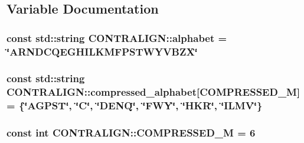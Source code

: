 \subsection{Variable Documentation}
\hypertarget{namespace_c_o_n_t_r_a_l_i_g_n_a2ff97191ea8854b1801441553af77857}{
\subsubsection[{alphabet}]{\setlength{\rightskip}{0pt plus 5cm}const std\+::string C\+O\+N\+T\+R\+A\+L\+I\+G\+N\+::alphabet = \char`\"{}A\+R\+N\+D\+C\+Q\+E\+G\+H\+I\+L\+K\+M\+F\+P\+S\+T\+W\+Y\+V\+B\+Z\+X\char`\"{}}}\label{namespace_c_o_n_t_r_a_l_i_g_n_a2ff97191ea8854b1801441553af77857}
\hypertarget{namespace_c_o_n_t_r_a_l_i_g_n_abc81d204924eda147b14d8d4da2b3f21}{
\subsubsection[{compressed\+\_\+alphabet}]{\setlength{\rightskip}{0pt plus 5cm}const std\+::string C\+O\+N\+T\+R\+A\+L\+I\+G\+N\+::compressed\+\_\+alphabet\mbox{[}{\bf C\+O\+M\+P\+R\+E\+S\+S\+E\+D\+\_\+\+M}\mbox{]} = \{\char`\"{}A\+G\+P\+S\+T\char`\"{}, \char`\"{}C\char`\"{}, \char`\"{}D\+E\+N\+Q\char`\"{}, \char`\"{}F\+W\+Y\char`\"{}, \char`\"{}H\+K\+R\char`\"{}, \char`\"{}I\+L\+M\+V\char`\"{}\}}}\label{namespace_c_o_n_t_r_a_l_i_g_n_abc81d204924eda147b14d8d4da2b3f21}
\hypertarget{namespace_c_o_n_t_r_a_l_i_g_n_a28d4592514704ed3e73d954d34bd4128}{
\subsubsection[{C\+O\+M\+P\+R\+E\+S\+S\+E\+D\+\_\+\+M}]{\setlength{\rightskip}{0pt plus 5cm}const int C\+O\+N\+T\+R\+A\+L\+I\+G\+N\+::\+C\+O\+M\+P\+R\+E\+S\+S\+E\+D\+\_\+\+M = 6}}\label{namespace_c_o_n_t_r_a_l_i_g_n_a28d4592514704ed3e73d954d34bd4128}

